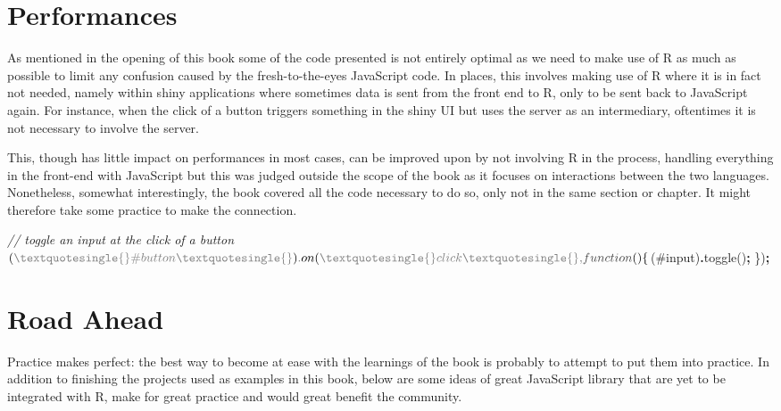 \documentclass[
]{krantz}
\makeatletter
\newenvironment{Shaded}{\begin{snugshade}}{\end{snugshade}}
\newcommand{\CommentTok}[1]{\textcolor[rgb]{0.37,0.37,0.37}{\textit{#1}}}
\newcommand{\FunctionTok}[1]{\textcolor[rgb]{0,0,0}{#1}}
\newcommand{\KeywordTok}[1]{\textcolor[rgb]{0.27,0.27,0.27}{\textbf{#1}}}
\newcommand{\NormalTok}[1]{#1}
\newcommand{\OperatorTok}[1]{\textcolor[rgb]{0.43,0.43,0.43}{\textbf{#1}}}
\newcommand{\StringTok}[1]{\textcolor[rgb]{0.5,0.5,0.5}{#1}}
\newenvironment{kframe}{%
\medskip{}
\setlength{\fboxsep}{.8em}
 \def\at@end@of@kframe{}%
 \ifinner\ifhmode%
  \def\at@end@of@kframe{\end{minipage}}%
  \begin{minipage}{\columnwidth}%
 \fi\fi%
 \def\FrameCommand##1{\hskip\@totalleftmargin \hskip-\fboxsep
 \colorbox{shadecolor}{##1}\hskip-\fboxsep
     \hskip-\linewidth \hskip-\@totalleftmargin \hskip\columnwidth}%
 \MakeFramed {\advance\hsize-\width
   \@totalleftmargin\z@ \linewidth\hsize
   \@setminipage}}%
 {\par\unskip\endMakeFramed%
 \at@end@of@kframe}
\renewenvironment{Shaded}{\begin{kframe}}{\end{kframe}}
\makeatother
\begin{document}
\hypertarget{conclusion-performances}{%
\section{Performances}\label{conclusion-performances}}

As mentioned in the opening of this book some of the code presented is not entirely optimal as we need to make use of R as much as possible to limit any confusion caused by the fresh-to-the-eyes JavaScript code. In places, this involves making use of R where it is in fact not needed, namely within shiny applications where sometimes data is sent from the front end to R, only to be sent back to JavaScript again. For instance, when the click of a button triggers something in the shiny UI but uses the server as an intermediary, oftentimes it is not necessary to involve the server.

This, though has little impact on performances in most cases, can be improved upon by not involving R in the process, handling everything in the front-end with JavaScript but this was judged outside the scope of the book as it focuses on interactions between the two languages. Nonetheless, somewhat interestingly, the book covered all the code necessary to do so, only not in the same section or chapter. It might therefore take some practice to make the connection.

\begin{Shaded}
\begin{Highlighting}[]
\CommentTok{// toggle an input at the click of a button}
\NormalTok{$(}\StringTok{\textquotesingle{}\#button\textquotesingle{}}\NormalTok{)}\OperatorTok{.}\FunctionTok{on}\NormalTok{(}\StringTok{\textquotesingle{}click\textquotesingle{}}\OperatorTok{,} \KeywordTok{function}\NormalTok{()\{}
\NormalTok{  $(}\StringTok{\textquotesingle{}\#input\textquotesingle{}}\NormalTok{)}\OperatorTok{.}\FunctionTok{toggle}\NormalTok{()}\OperatorTok{;}
\NormalTok{\})}\OperatorTok{;}
\end{Highlighting}
\end{Shaded}

\hypertarget{conclusion-ahead}{%
\section{Road Ahead}\label{conclusion-ahead}}

Practice makes perfect: the best way to become at ease with the learnings of the book is probably to attempt to put them into practice. In addition to finishing the projects used as examples in this book, below are some ideas of great JavaScript library that are yet to be integrated with R, make for great practice and would great benefit the community.
\end{document}
